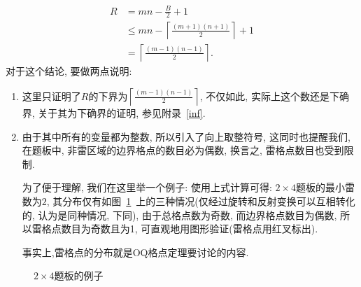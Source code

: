 \documentclass{ctexart}
\newcommand{\varible}[1]{{\Noto[#1]}}
\newcommand{\redcross}[2]{
    \begin{scope}[thick,color = red,shift={(#1,#2)}]
        \draw (0.05,-0.05) -- (-0.05,0.05);
        \draw (-0.05,-0.05) -- (0.05,0.05);
    \end{scope}
}
\begin{document}
\begin{align}
    R &= mn - \frac{B}{2} + 1 \nonumber\\ 
      &\leqslant mn - \left\lceil \frac{(m+1)(n+1)}{2} \right\rceil + 1 \nonumber\\
      &= \left\lceil \frac{(m-1)(n-1)}{2} \right\rceil.
\end{align}
对于这个结论, 要做两点说明:
\begin{enumerate}
    \item 这里只证明了$R$的下界为$\left\lceil \frac{(m-1)(n-1)}{2} \right\rceil$, 不仅如此, 实际上这个数还是下确界, 关于其为下确界的证明, 参见附录\ \ref{inf}.
    \item 由于其中所有的变量都为整数, 所以引入了向上取整符号, 这同时也提醒我们, 在\varible{O}\varible{Q}题板中, 非雷区域的边界格点的数目必为偶数, 换言之, 雷格点数目也受到限制.
    
    为了便于理解, 我们在这里举一个例子: 使用上式计算可得: $2\times4$题板的最小雷数为$2$, 其分布仅有如图\ \ref{example}\ 上的三种情况(仅经过旋转和反射变换可以互相转化的, 认为是同种情况, 下同), 由于总格点数为奇数, 而边界格点数目为偶数, 所以雷格点数目为奇数且为1, 可直观地用图形验证(雷格点用红叉标出).

    事实上,雷格点的分布就是OQ格点定理要讨论的内容.
\end{enumerate}
\begin{figure}[ht]
    \centering
    \quad
    \quad
    \caption{$2\times4$题板的例子}
    \label{example}
\end{figure}
\end{document}
